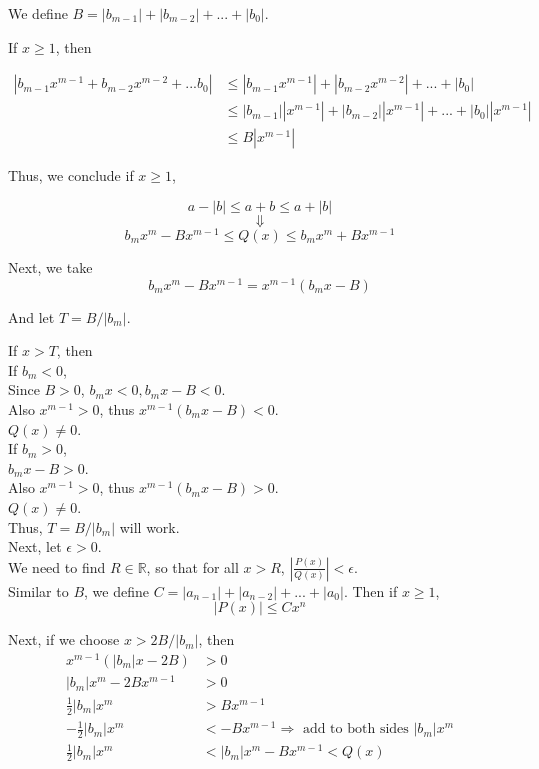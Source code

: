 \documentclass{article}
\begin{document}
We define $B = |b_{m-1}| + |b_{m-2}| + ... + |b_0|$.

If $x\geq 1$, then

\begin{align*}
  |b_{m-1} x^{m-1} + b_{m-2} x^{m-2} + ... b_0| &\leq |b_{m-1} x^{m-1}| + |b_{m-2} x^{m-2}| +...+ |b_0|\\
                                                &\leq |b_{m-1}||x^{m-1}| + |b_{m-2}||x^{m-1}| +...+ |b_0||x^{m-1}|\\
                                                &\leq B|x^{m-1}|
\end{align*}

Thus, we conclude if $x\geq 1$,

$$ a - |b| \leq a+b \leq a + |b|$$
$$ \Downarrow $$
$$b_m x^m - Bx^{m-1} \leq Q(x) \leq b_mx^m + Bx^{m-1}$$

Next, we take
$$ b_mx^m - Bx^{m-1} = x^{m-1}(b_m x - B)$$

And let $T = B/|b_m|$.

If $x > T$, then\\

\noindent If $b_m < 0$,\\
Since $B>0$, $b_mx<0, b_mx-B < 0$.\\
Also $x^{m-1} > 0$, thus $x^{m-1}(b_m x -B) < 0$.\\
$Q(x) \neq 0$.\\

\noindent If $b_m > 0$,\\
$b_mx-B > 0$.\\
Also $x^{m-1} > 0$, thus $x^{m-1}(b_m x -B) > 0$.\\
$Q(x) \neq 0$.\\

\noindent Thus, $T = B/|b_m|$ will work.\\
Next, let $\epsilon > 0$.\\
We need to find $R \in \mathbb{R}$, so that for all $x > R$, $|\frac{P(x)}{Q(x)}| < \epsilon$.\\

Similar to $B$, we define $C = |a_{n-1}| + |a_{n-2}| + ... + |a_0|$. Then if $x \geq 1$, $$|P(x)| \leq Cx^n$$

Next, if we choose $x > 2B/|b_m|$, then
\begin{align*}
  x^{m-1}(|b_m|x - 2B) &> 0\\
  |b_m| x^m - 2B x^{m-1} &> 0\\
  \frac{1}{2} |b_m| x^m &> B x^{m-1}\\
  - \frac{1}{2} |b_m| x^m &< -B x^{m-1} \Rightarrow \text{ add to both sides } |b_m|x^m\\
  \frac{1}{2} |b_m| x^m &< |b_m| x^m -B x^{m-1}< Q(x)
\end{align*}
\end{document}
